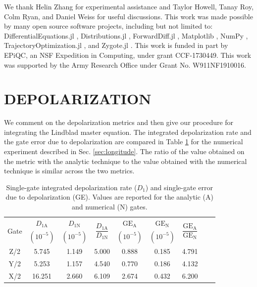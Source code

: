 \documentclass[
  amsfonts,
  amsmath,
  amssymb,
  pra,
  twocolumn,
  superscriptaddress,
]{revtex4-2}
\begin{document}
\begin{acknowledgments}
  We thank Helin Zhang for experimental assistance
  and Taylor Howell, Tanay Roy, Colm Ryan, and Daniel Weiss for useful discussions.
  This work was made possible by many open source software projects,
  including but not limited to:
  DifferentialEquations.jl \cite{rackauckas2017differentialequations},
  Distributions.jl \cite{besancon2019distributions},
  ForwardDiff.jl \cite{revelsLubinPapamarkou2016},
  Matplotlib \cite{hunter2007matplotlib},
  NumPy \cite{harris2020array},
  TrajectoryOptimization.jl \cite{howell2019altro},
  and Zygote.jl \cite{innes2018don}.
  This work is funded in part by EPiQC, an NSF Expedition in Computing, under grant CCF-1730449.
  This work was supported by the Army Research Office under Grant No. W911NF1910016.
\end{acknowledgments}

\appendix
\section{DEPOLARIZATION \label{appendix:longitude}}
We comment on the depolarization metrics and then give
our procedure for integrating the Lindblad master equation.
The integrated depolarization rate and the gate error due to
depolarization
are compared in Table \ref{tab:longitude} for the
numerical experiment described in Sec. \ref{sec:longitude}.
The ratio of the value obtained on the metric with the analytic technique
to the value obtained with the numerical technique
is similar across the two metrics.

\begin{table}[ht]
  \begin{tabular}{| c | c | c | c | c | c | c | c | c |}
    \hline
    \multirow{2}{*}{Gate} &
    $D_{1\textrm{A}}$ &
    $D_{1\textrm{N}}$ &
    \multirow{2}{*}{$\dfrac{ D_{1\textrm{A}} }{ D_{1\textrm{N}} }$} &
    $\textrm{GE}_{\textrm{A}}$ &
    $\textrm{GE}_{\textrm{N}}$ &
    \multirow{2}{*}{$\dfrac{ \textrm{GE}_{\textrm{A}} }{ \textrm{GE}_{\textrm{N}} }$}\\
    &
    $(10^{-5})$ &
    $(10^{-5})$ &
    &
    $(10^{-5})$ &
    $(10^{-5})$ &\\
    \hline
    Z/2 & 5.745 & 1.149 & 5.000 & 0.888   & 0.185  & 4.791\\
    \hline
    Y/2 & 5.253 & 1.157 & 4.540 & 0.770 & 0.186   & 4.132\\
    \hline
    X/2 & 16.251 & 2.660 & 6.109 & 2.674 & 0.432  & 6.200\\
    \hline
  \end{tabular}
  \caption{
    Single-gate integrated depolarization rate ($D_{1}$)
    and single-gate error due to depolarization (GE).
    Values are reported for the analytic (A) and numerical (N) gates.
  }
  \label{tab:longitude}
\end{table}
\end{document}
